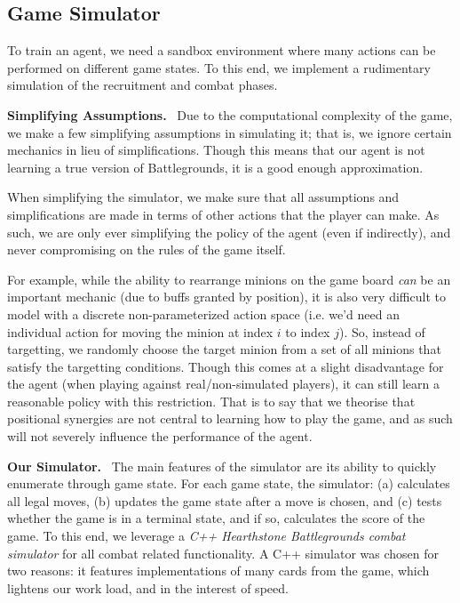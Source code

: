 \documentclass{paper}
\newcommand{\inlineSection}[1]{\vspace{0.5em}\noindent\textbf{#1.}~}
\begin{document}
\subsection{Game Simulator}

To train an agent, we need a sandbox environment where many actions can be performed on different game states. To this end, we implement a rudimentary simulation of the recruitment and combat phases. 

\inlineSection{Simplifying Assumptions} Due to the computational complexity of the game, we make a few simplifying assumptions in simulating it; that is, we ignore certain mechanics in lieu of simplifications. Though this means that our agent is not learning a true version of Battlegrounds, it is a good enough approximation. 

When simplifying the simulator, we make sure that all assumptions and simplifications are made in terms of other actions that the player can make. As such, we are only ever simplifying the policy of the agent (even if indirectly), and never compromising on the rules of the game itself. 

For example, while the ability to rearrange minions on the game board \textit{can} be an important mechanic (due to buffs granted by position), it is also very difficult to model with a discrete non-parameterized action space (i.e. we'd need an individual action for moving the minion at index $i$ to index $j$). So, instead of targetting, we randomly choose the target minion from a set of all minions that satisfy the targetting conditions. Though this comes at a slight disadvantage for the agent (when playing against real/non-simulated players), it can still learn a reasonable policy with this restriction. That is to say that we theorise that positional synergies are not central to learning how to play the game, and as such will not severely influence the performance of the agent.  

\inlineSection{Our Simulator} The main features of the simulator are its ability to quickly enumerate through game state. For each game state, the simulator: (a) calculates all legal moves, (b) updates the game state after a move is chosen, and (c) tests whether the game is in a terminal state, and if so, calculates the score of the game. To this end, we leverage a \textit{C++ Hearthstone Battlegrounds combat simulator} for all combat related functionality. A C++ simulator was chosen for two reasons: it features implementations of many cards from the game, which lightens our work load, and in the interest of speed.
\end{document}
